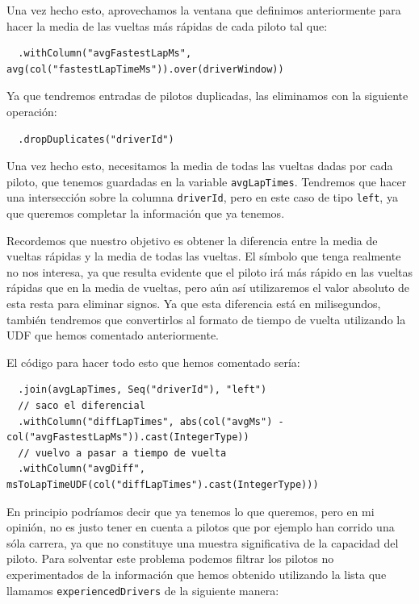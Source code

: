 \documentclass[12pt,twoside,titlepage]{report}
\begin{document}
Una vez hecho esto, aprovechamos la ventana que definimos anteriormente para hacer la media de las vueltas más rápidas de cada piloto tal que:

\begin{lstlisting}
  .withColumn("avgFastestLapMs", avg(col("fastestLapTimeMs")).over(driverWindow))
\end{lstlisting}

Ya que tendremos entradas de pilotos duplicadas, las eliminamos con la siguiente operación:

\begin{lstlisting}
  .dropDuplicates("driverId")
\end{lstlisting}

Una vez hecho esto, necesitamos la media de todas las vueltas dadas por cada piloto, que tenemos guardadas en la variable \texttt{avgLapTimes}. Tendremos que hacer una intersección sobre la columna \texttt{driverId}, pero en este caso de tipo \texttt{left}, ya que queremos completar la información que ya tenemos.

Recordemos que nuestro objetivo es obtener la diferencia entre la media de vueltas rápidas y la media de todas las vueltas. El símbolo que tenga realmente no nos interesa, ya que resulta evidente que el piloto irá más rápido en las vueltas rápidas que en la media de vueltas, pero aún así utilizaremos el valor absoluto de esta resta para eliminar signos. Ya que esta diferencia está en milisegundos, también tendremos que convertirlos al formato de tiempo de vuelta utilizando la UDF que hemos comentado anteriormente.

El código para hacer todo esto que hemos comentado sería:

\begin{lstlisting}
  .join(avgLapTimes, Seq("driverId"), "left")
  // saco el diferencial
  .withColumn("diffLapTimes", abs(col("avgMs") - col("avgFastestLapMs")).cast(IntegerType))
  // vuelvo a pasar a tiempo de vuelta
  .withColumn("avgDiff", msToLapTimeUDF(col("diffLapTimes").cast(IntegerType)))
\end{lstlisting}

En principio podríamos decir que ya tenemos lo que queremos, pero en mi opinión, no es justo tener en cuenta a pilotos que por ejemplo han corrido una sóla carrera, ya que no constituye una muestra significativa de la capacidad del piloto. Para solventar este problema podemos filtrar los pilotos no experimentados de la información que hemos obtenido utilizando la lista que llamamos \texttt{experiencedDrivers} de la siguiente manera:
\end{document}
